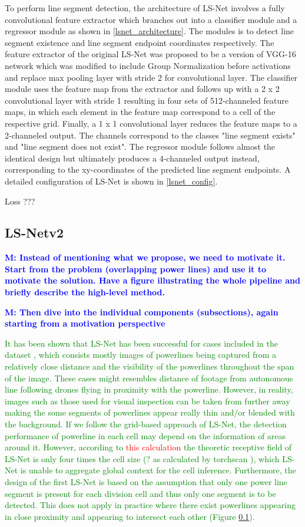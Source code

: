 \documentclass[journal]{IEEEtran}
\newcommand{\commentM}[1]{\textbf{\textcolor{blue}{M: #1}}}
\begin{document}
To perform line segment detection, the architecture of LS-Net involves a fully convolutional feature extractor which branches out into a classifier module and a regressor module as shown in \ref{lsnet_architecture}. The modules is to detect line segment existence and line segment endpoint coordinates respectively. The feature extractor of the original LS-Net was proposed to be a version of VGG-16 network \cite{VGG16} which was modified to include Group Normalization \cite{group_norm} before activations and replace max pooling layer with stride 2 for convolutional layer. The classifier module uses the feature map from the extractor and follows up with a 2 x 2 convolutional layer with stride 1 resulting in four sets of 512-channeled feature maps, in which each element in the feature map correspond to a cell of the respective grid. Finally, a 1 x 1 convolutional layer reduces the feature maps to a 2-channeled output. The channels correspond to the classes "line segment exists" and "line segment does not exist". The regressor module follows almost the identical design but ultimately produces a 4-channeled output instead, corresponding to the xy-coordinates of the predicted line segment endpoints. A detailed configuration of LS-Net is shown in \ref{lsnet_config}.

Loss ???

\subsection{LS-Netv2}
\commentM{Instead of mentioning what we propose, we need to motivate it. Start from the problem (overlapping power lines) and use it to motivate the solution. Have a figure illustrating the whole pipeline and briefly describe the high-level method.}

\commentM{Then dive into the individual components (subsections), again starting from a motivation perspective}

\textcolor{green}{It has been shown that LS-Net has been successful for cases included in the dataset \cite{}, which consists mostly images of powerlines being captured from a relatively close distance and the visibility of the powerlines throughout the span of the image. These cases might resembles distance of footage from autonomous line following drones flying in proximity with the powerline. However, in reality, images such as those used for visual inspection can be taken from further away making the some segments of powerlines appear really thin and/or blended with the background. If we follow the grid-based approach of LS-Net, the detection performance of powerline in each cell may depend on the information of areas around it. However, according to \textcolor{red}{this calculation} the theoretic receptive field of LS-Net is only four times the cell size (? as calculated by torchscan \cite{torchscan}), which LS-Net is unable to aggregate global context for the cell inference. Furthermore, the design of the first LS-Net is based on the assumption that only one power line segment is present for each division cell and thus only one segment is to be detected. This does not apply in practice where there exist powerlines appearing in close proximity and appearing to intersect each other (Figure \ref{}).}
\end{document}
